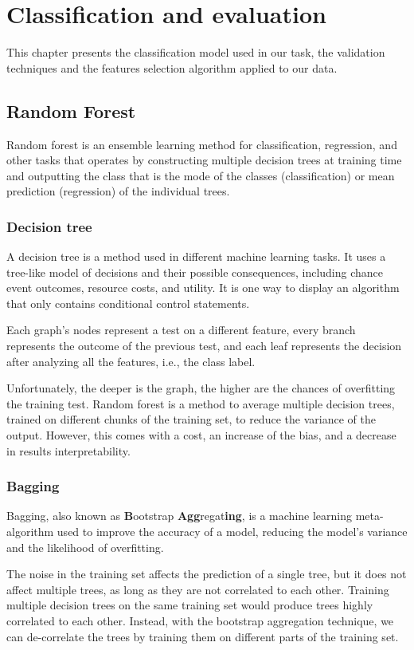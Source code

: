 \chapter{Classification and evaluation}
This chapter presents the classification model used in our task, the validation techniques and the features selection algorithm applied to our data.
\section{Random Forest}
Random forest is an ensemble learning method for classification, regression, and other tasks that operates by constructing multiple decision trees at training time and outputting the class that is the mode of the classes (classification) or mean prediction (regression) of the individual trees. \cite{ho1995random}
\subsection{Decision tree}
A decision tree is a method used in different machine learning tasks. It uses a tree-like model of decisions and their possible consequences, including chance event outcomes, resource costs, and utility. It is one way to display an algorithm that only contains conditional control statements. \cite{kaminski2018framework}

Each graph's nodes represent a test on a different feature, every branch represents the outcome of the previous test, and each leaf represents the decision after analyzing all the features, i.e., the class label. 

Unfortunately, the deeper is the graph, the higher are the chances of overfitting the training test.
Random forest is a method to average multiple decision trees, trained on different chunks of the training set, to reduce the variance of the output. However, this comes with a cost, an increase of the bias, and a decrease in results interpretability. \cite{hastie2009elements}
\subsection{Bagging}

Bagging, also known as \textbf{B}ootstrap \textbf{Agg}regat\textbf{ing}, is a machine learning meta-algorithm used to improve the accuracy of a model, reducing the model's variance and the likelihood of overfitting. 

The noise in the training set affects the prediction of a single tree, but it does not affect multiple trees, as long as they are not correlated to each other. Training multiple decision trees on the same training set would produce trees highly correlated to each other. Instead, with the bootstrap aggregation technique, we can de-correlate the trees by training them on different parts of the training set. \cite{breiman1996bagging}

